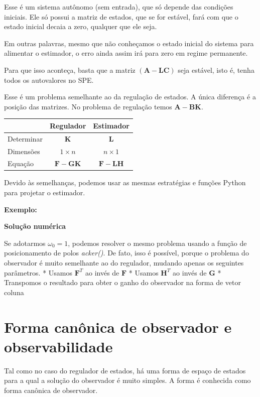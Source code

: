 \documentclass[
]{book}
\begin{document}
Esse é um sistema autônomo (sem entrada), que só depende das condições
iniciais. Ele só possui a matriz de estados, que se for estável, fará
com que o estado inicial decaia a zero, qualquer que ele seja.

Em outras palavras, mesmo que não conheçamos o estado inicial do sistema
para alimentar o estimador, o erro ainda assim irá para zero em regime
permanente.

Para que isso aconteça, basta que a matriz \(\mathbf{(A-LC)}\) seja
estável, isto é, tenha todos os autovalores no SPE.

Esse é um problema semelhante ao da regulação de estados. A única
diferença é a posição das matrizes. No problema de regulação temos
\(\mathbf{A-BK}\).

\begin{longtable}[]{@{}lcc@{}}
\toprule\noalign{}
& Regulador & Estimador \\
\midrule\noalign{}
\endhead
\bottomrule\noalign{}
\endlastfoot
Determinar & \(\mathbf{K}\) & \(\mathbf{L}\) \\
Dimensões & \(1\times n\) & \(n\times 1\) \\
Equação & \(\mathbf{F-GK}\) & \(\mathbf{F-LH}\) \\
\end{longtable}

Devido às semelhanças, podemos usar as mesmas estratégias e funções
Python para projetar o estimador.

\textbf{Exemplo:}



\textbf{Solução numérica}

Se adotarmos \(\omega_0=1\), podemos resolver o mesmo problema usando a
função de posicionamento de polos \emph{acker()}. De fato, isso é possível,
porque o problema do observador é muito semelhante ao do regulador,
mudando apenas os seguintes parâmetros. * Usamos \(\mathbf{F}^T\) ao
invés de \(\mathbf{F}\) * Usamos \(\mathbf{H}^T\) ao invés de \(\mathbf{G}\)
* Transpomos o resultado para obter o ganho do observador na forma de
vetor coluna

\hypertarget{forma-canuxf4nica-de-observador-e-observabilidade}{%
\section{Forma canônica de observador e observabilidade}\label{forma-canuxf4nica-de-observador-e-observabilidade}}

Tal como no caso do regulador de estados, há uma forma de espaço de
estados para a qual a solução do observador é muito simples. A forma é
conhecida como forma canônica de observador.
\end{document}
